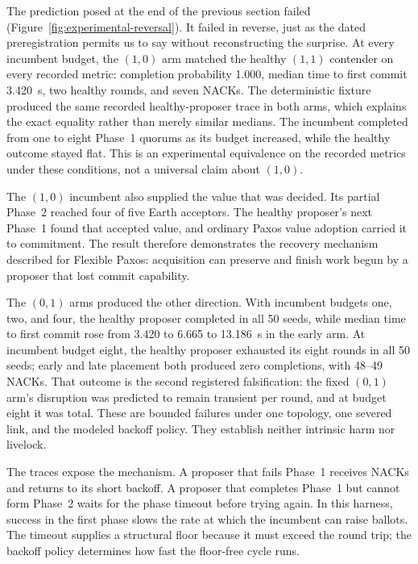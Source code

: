 \documentclass[letterpaper,twocolumn,10pt]{article}
\newcounter{prop}
\newcounter{cor}
\begin{document}
The prediction posed at the end of the previous section failed (Figure~\ref{fig:experimental-reversal}). It failed in reverse, just as the dated preregistration permits us to say without reconstructing the surprise. At every incumbent budget, the $(1,0)$ arm matched the healthy $(1,1)$ contender on every recorded metric: completion probability 1.000, median time to first commit 3.420~s, two healthy rounds, and seven NACKs. The deterministic fixture produced the same recorded healthy-proposer trace in both arms, which explains the exact equality rather than merely similar medians. The incumbent completed from one to eight Phase~1 quorums as its budget increased, while the healthy outcome stayed flat. This is an experimental equivalence on the recorded metrics under these conditions, not a universal claim about $(1,0)$.

The $(1,0)$ incumbent also supplied the value that was decided. Its partial Phase~2 reached four of five Earth acceptors. The healthy proposer's next Phase~1 found that accepted value, and ordinary Paxos value adoption carried it to commitment. The result therefore demonstrates the recovery mechanism described for Flexible Paxos: acquisition can preserve and finish work begun by a proposer that lost commit capability.

The $(0,1)$ arms produced the other direction. With incumbent budgets one, two, and four, the healthy proposer completed in all 50 seeds, while median time to first commit rose from 3.420 to 6.665 to 13.186~s in the early arm. At incumbent budget eight, the healthy proposer exhausted its eight rounds in all 50 seeds; early and late placement both produced zero completions, with 48--49 NACKs. That outcome is the second registered falsification: the fixed $(0,1)$ arm's disruption was predicted to remain transient per round, and at budget eight it was total. These are bounded failures under one topology, one severed link, and the modeled backoff policy. They establish neither intrinsic harm nor livelock.

The traces expose the mechanism. A proposer that fails Phase~1 receives NACKs and returns to its short backoff. A proposer that completes Phase~1 but cannot form Phase~2 waits for the phase timeout before trying again. In this harness, success in the first phase slows the rate at which the incumbent can raise ballots. The timeout supplies a structural floor because it must exceed the round trip; the backoff policy determines how fast the floor-free cycle runs.
\end{document}
